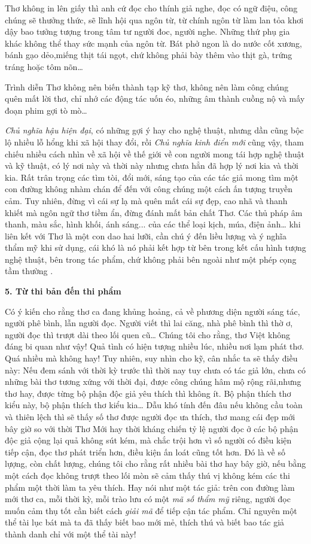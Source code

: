 \documentclass[../main.tex]{subfiles}
\begin{document}
\begin{multicols}{2}
Thơ không in lên giấy thì anh cứ đọc cho thính giả nghe, đọc có ngữ điệu, công chúng sẽ thưởng thức, sẽ lĩnh hội qua ngôn từ, từ chính ngôn từ làm lan tỏa khơi dậy bao tưởng tượng trong tâm tư người đoc, người nghe. Những thứ phụ gia khác không thể thay sức mạnh của ngôn từ. Bát phở ngon là do nước cốt xương, bánh gạo dẻo,miếng thịt tái ngọt, chứ không phải bày thêm vào thịt gà, trứng tráng hoặc tôm nõn… 
 
Trình diễn Thơ không nên biến thành tạp kỹ thơ, không nên làm công chúng quên mất lời thơ, chỉ nhớ các động tác uốn éo, những âm thành cuồng nộ và mấy đoạn phim gợi tò mò… 
 
\textit{Chủ nghĩa hậu hiện đại}, có những gợi ý hay cho nghệ thuật, nhưng dần cũng bộc lộ nhiều lỗ hổng khi xã hội thay đổi, rồi \textit{Chủ nghĩa kinh điển mới} cũng vậy, tham chiếu nhiều cách nhìn về  xã hội về thế giới về con người mong tái hợp nghệ thuật và kỹ thuật, có lý nơi này và thời này nhưng chưa hẳn đã hợp lý nơi kia và thời kia. Rất trân trọng các tìm tòi, đổi mới, sáng tạo của các tác giả mong tìm một con đường không nhàm chán để đến với  công chúng một cách ấn tượng truyền cảm. Tuy nhiên, đừng vì cái sự lạ  mà quên mất cái sự đẹp, cao nhã và thanh khiết  mà ngôn ngữ thơ tiềm ẩn, đừng đánh mất bản chất Thơ. Các thủ pháp âm thanh, màu sắc, hình khối, ánh sáng... của các thể loại kịch, múa, điện ảnh… khi liên kết với Thơ là một con dao hai lưỡi, cần chú ý đến liều lượng và ý nghĩa thẩm mỹ khi sử dụng, cái khó là nó phải kết hợp từ bên trong kết cấu hình tượng nghệ thuật, bên trong tác phẩm, chứ không phải bên ngoài như một phép cọng tầm thường .  
 
 
\textbf{5. Từ thi bản đến thi phẩm} 
 
Có ý kiến cho rằng thơ ca đang khủng hoảng, cả về phương diện người sáng tác, người phê bình, lẫn người đọc. Người viết thì lai căng, nhà phê bình thì thờ ơ, người đọc thì trượt dài theo lối quen cũ… Chúng tôi cho rằng, thơ Việt không đáng bi quan như vậy! Quả tình có hiện tượng nhiều lúc, nhiều nơi  lạm phát thơ. Quá nhiều mà không hay! Tuy nhiên, suy nhìn cho kỹ, cân nhắc ta sẽ thấy điều này: Nếu đem sánh với thời kỳ trước thì thời nay tuy chưa có tác giả lớn, chưa có những bài thơ tương xứng với thời đại, được công chúng hâm mộ rộng rãi,nhưng thơ hay, được từng bộ phận độc giả yêu thích thì không ít. Bộ phận thích thơ kiểu này, bộ phận thích thơ kiểu kia… Dẫu khó tính đến đâu nếu không cầu toàn và thiên lệch thì sẽ thấy số thơ được người đọc ưa thích, thơ mang cái đẹp mới bây giờ so với thời Thơ Mới hay thời kháng chiến tỷ lệ người đọc ở các bộ phận độc giả cộng lại quả không sút kém, mà chắc trội hơn vì số người có điều kiện tiếp cận, đọc thơ phát triển hơn, điều kiện ấn loát cũng tốt hơn. Đó là về số lựợng, còn chất lượng, chúng tôi cho rằng rất nhiều bài thơ hay bây giờ, nếu bằng một cách đọc không trượt theo lối mòn sẽ cảm thấy thú vị không kém các thi phẩm một thời làm ta yêu thích. Hay nói như một tác giả: trên con đường làm mới thơ ca, mỗi thời kỳ, mỗi trào lưu có một \textit{mã số thẩm mỹ} riêng, người đọc muốn cảm thụ tốt cần biết cách \textit{giải mã} để tiếp cận tác phẩm. Chỉ nguyên một thể tài lục bát mà ta đã thấy biết bao mới mẻ, thích thú và biết bao tác giả thành danh chỉ với một thể tài này!  
 

\end{multicols}
\end{document}
